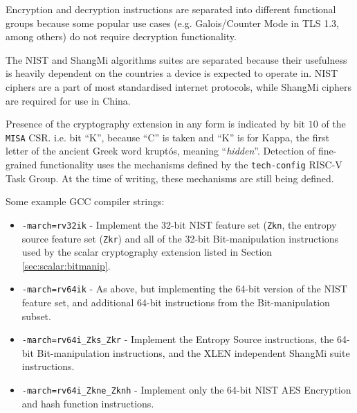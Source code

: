 Encryption and decryption instructions are separated into different functional
groups because some popular use cases (e.g. Galois/Counter Mode in TLS 1.3, among others)
do not require decryption functionality.

The NIST and ShangMi algorithms suites are separated because their usefulness is
heavily dependent on the countries a device is expected to operate in.
NIST ciphers are a part of most standardised internet protocols, while ShangMi ciphers are
required for use in China.

Presence of the cryptography extension in any form is indicated
by bit $10$ of the {\tt MISA} CSR.
i.e. bit ``K'', because ``C'' is taken and ``K'' is for Kappa, the
first letter of the ancient Greek word kruptós,
meaning ``{\em hidden}''.
Detection of fine-grained functionality uses the mechanisms defined
by the {\tt tech-config} RISC-V Task Group.
At the time of writing, these mechanisms are still being defined.

Some example GCC compiler strings:
\begin{itemize}
\item {\tt -march=rv32ik} -
    Implement the 32-bit NIST feature set ({\tt Zkn},
    the entropy source feature set ({\tt Zkr}) and
    all of the 32-bit Bit-manipulation instructions used by the
    scalar cryptography extension listed in Section \ref{sec:scalar:bitmanip}.
\item {\tt -march=rv64ik} -
    As above, but implementing the 64-bit version of the NIST feature set,
    and additional 64-bit instructions from the Bit-manipulation subset.
\item {\tt -march=rv64i\_Zks\_Zkr} -
    Implement the Entropy Source instructions,
    the 64-bit Bit-manipulation instructions,
    and the XLEN independent ShangMi suite instructions.
\item {\tt -march=rv64i\_Zkne\_Zknh} -
    Implement only the 64-bit NIST AES Encryption and hash function instructions.
\end{itemize}

